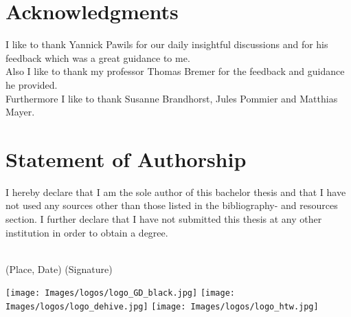 \documentclass[a4paper, twoside, 10pt]{report}
\begin{document}












\printbibliography

\listoffigures



\chapter*{Acknowledgments}
I like to thank Yannick Pawils for our daily insightful discussions and for his feedback which was a great guidance to me. \\
Also I like to thank my professor Thomas Bremer for the feedback and guidance he provided.\\
Furthermore I like to thank Susanne Brandhorst, Jules Pommier and Matthias Mayer.



\chapter*{Statement of Authorship}
I hereby declare that I am the sole author of this bachelor thesis and that I have not used any sources other than those listed in the bibliography- and resources section. I further declare that I have not submitted this thesis at any other institution in order to obtain a degree.
\begin{spacing}{5}
\null
\begin{spacing}{1}
\noindent
\dotfill \space \space \dotfill \\
(Place, Date) \hfill (Signature)\hfill \null
\end{spacing}
\end{spacing}



\newpage
\pagestyle{empty}
\centering
\vfill
\texttt{[image: Images/logos/logo\_GD\_black.jpg]}
\vfill
\vspace*{-2cm}
\texttt{[image: Images/logos/logo\_dehive.jpg]}
\vfill
\texttt{[image: Images/logos/logo\_htw.jpg]}
\vfill



\blankpage
\blankpage
\blankpage

\end{document}
